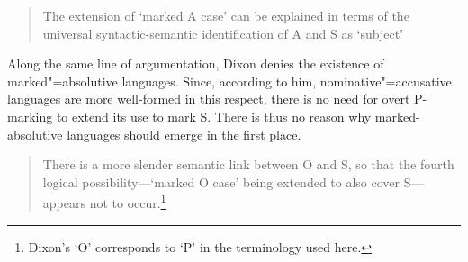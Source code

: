 \begin{quote} The extension of `marked A case' can be explained in terms of the universal syntactic-semantic identification of A and S as `subject'
\citep[78]{Dixon:1979} \end{quote} 

Along the same line of argumentation, Dixon denies the existence of marked"=absolutive languages.
Since, according to him, nominative"=accusative languages are more well-formed in this respect, there is no need for overt P-marking to extend its use to mark S.
There is thus no reason why marked-absolutive languages should emerge in the first place.

\begin{quote} 
There is a more slender semantic link between O  and S, so that the fourth logical possibility---`marked O case' being extended to also cover S---appears not to occur.\footnote{Dixon's `O' corresponds to `P' in the terminology used here.} \citep[78]{Dixon:1979}  \end{quote}

